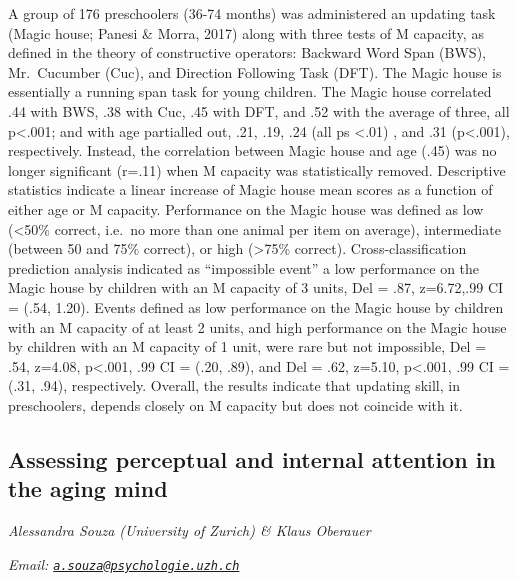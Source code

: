 \documentclass[12pt,]{book}
\begin{document}
A group of 176 preschoolers (36-74 months) was administered an updating task (Magic house; Panesi \& Morra, 2017) along with three tests of M capacity, as defined in the theory of constructive operators: Backward Word Span (BWS), Mr.~Cucumber (Cuc), and Direction Following Task (DFT). The Magic house is essentially a running span task for young children. The Magic house correlated .44 with BWS, .38 with Cuc, .45 with DFT, and .52 with the average of three, all p\textless{}.001; and with age partialled out, .21, .19, .24 (all ps \textless{}.01) , and .31 (p\textless{}.001), respectively. Instead, the correlation between Magic house and age (.45) was no longer significant (r=.11) when M capacity was statistically removed. Descriptive statistics indicate a linear increase of Magic house mean scores as a function of either age or M capacity. Performance on the Magic house was defined as low (\textless{}50\% correct, i.e.~no more than one animal per item on average), intermediate (between 50 and 75\% correct), or high (\textgreater{}75\% correct). Cross-classification prediction analysis indicated as ``impossible event'' a low performance on the Magic house by children with an M capacity of 3 units, Del = .87, z=6.72,.99 CI = (.54, 1.20). Events defined as low performance on the Magic house by children with an M capacity of at least 2 units, and high performance on the Magic house by children with an M capacity of 1 unit, were rare but not impossible, Del = .54, z=4.08, p\textless{}.001, .99 CI = (.20, .89), and Del = .62, z=5.10, p\textless{}.001, .99 CI = (.31, .94), respectively. Overall, the results indicate that updating skill, in preschoolers, depends closely on M capacity but does not coincide with it.

\hypertarget{assessing-perceptual-and-internal-attention-in-the-aging-mind}{%
\subsection{Assessing perceptual and internal attention in the aging mind}\label{assessing-perceptual-and-internal-attention-in-the-aging-mind}}

\emph{Alessandra Souza (University of Zurich) \& Klaus Oberauer}

\emph{Email: \href{mailto:a.souza@psychologie.uzh.ch}{\nolinkurl{a.souza@psychologie.uzh.ch}}}
\end{document}
